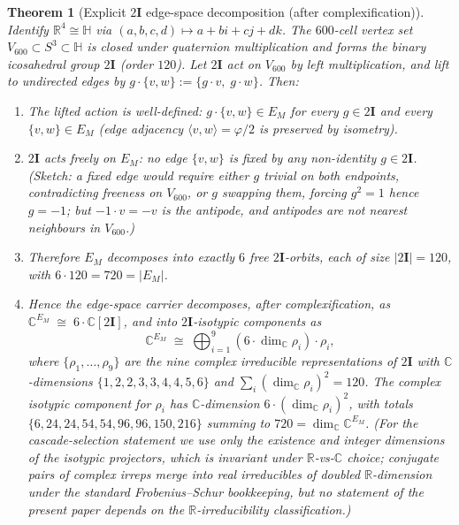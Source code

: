 \documentclass[11pt]{article}
\newtheorem{theorem}{Theorem}[section]
\theoremstyle{definition}
\newcommand{\R}{\mathbb{R}}
\newcommand{\C}{\mathbb{C}}
\newcommand{\HH}{\mathbb{H}}
\newcommand{\twoI}{2\mathbf{I}}
\begin{document}
\begin{theorem}[Explicit $\twoI$ edge-space decomposition (after complexification)]\label{thm:edge-decomp}
Identify $\R^4 \cong \HH$ via $(a, b, c, d) \mapsto a + bi + cj + dk$. The $600$-cell vertex set $V_{600} \subset S^3 \subset \HH$ is closed under quaternion multiplication and forms the binary icosahedral group $\twoI$ (order $120$). Let $\twoI$ act on $V_{600}$ by left multiplication, and lift to undirected edges by $g\cdot\{v,w\} := \{g\cdot v,\; g\cdot w\}$. Then:
\begin{enumerate}
\item The lifted action is well-defined: $g \cdot \{v,w\} \in E_M$ for every $g \in \twoI$ and every $\{v,w\} \in E_M$ (edge adjacency $\langle v,w\rangle = \varphi/2$ is preserved by isometry).
\item $\twoI$ acts \emph{freely} on $E_M$: no edge $\{v,w\}$ is fixed by any non-identity $g \in \twoI$. (Sketch: a fixed edge would require either $g$ trivial on both endpoints, contradicting freeness on $V_{600}$, or $g$ swapping them, forcing $g^2 = 1$ hence $g = -1$; but $-1\cdot v = -v$ is the antipode, and antipodes are not nearest neighbours in $V_{600}$.)
\item Therefore $E_M$ decomposes into exactly $\boxed{6}$ free $\twoI$-orbits, each of size $|\twoI| = 120$, with $6 \cdot 120 = 720 = |E_M|$.
\item Hence the edge-space carrier decomposes, \emph{after complexification}, as $\C^{E_M} \;\cong\; 6 \cdot \C[\twoI]$, and into $\twoI$-isotypic components as
\[
   \C^{E_M} \;\cong\; \bigoplus_{i=1}^{9} (6 \cdot \dim_\C \rho_i)\cdot \rho_i,
\]
where $\{\rho_1,\ldots,\rho_9\}$ are the nine complex irreducible representations of $\twoI$ with $\C$-dimensions $\{1,2,2,3,3,4,4,5,6\}$ and $\sum_i (\dim_\C\rho_i)^2 = 120$. The complex isotypic component for $\rho_i$ has $\C$-dimension $6\cdot(\dim_\C\rho_i)^2$, with totals $\{6, 24, 24, 54, 54, 96, 96, 150, 216\}$ summing to $720 = \dim_\C \C^{E_M}$. (For the cascade-selection statement we use only the existence and integer dimensions of the isotypic projectors, which is invariant under $\R$-vs-$\C$ choice; conjugate pairs of complex irreps merge into real irreducibles of doubled $\R$-dimension under the standard Frobenius--Schur bookkeeping, but no statement of the present paper depends on the $\R$-irreducibility classification.)
\end{enumerate}
\end{theorem}
\end{document}
